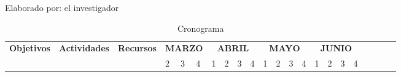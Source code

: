
\begin{landscape}
  \begin{ThreePartTable}
    \begin{TableNotes}[flushleft]
      \centering
      \item Elaborado por: el investigador
    \end{TableNotes}
    \begin{longtable}{|p{}|p{5.5cm}|p{5.5cm}|l|l|l|l|l|l|l|l|l|l|l|l|l|l|l|l|l|l|l|}
      \caption{Cronograma}
      \label{table:cronograma}                                                                                                                                                                                                                                                                                                                                                                                                                                                                                                                                                                                                                                                                                                                                                                                                                                   \\
      \hline
      \multirow{2}{*}{\bfseries Objetivos}                                                                                                                                                     & \multirow{2}{*}{\bfseries Actividades}                                                     & \multirow{2}{*}{\bfseries Recursos}                                                                              & \multicolumn{3}{|c|}{\bfseries MARZO} & \multicolumn{4}{|c|}{\bfseries ABRIL} & \multicolumn{4}{|c|}{\bfseries MAYO} & \multicolumn{4}{|c|}{\bfseries JUNIO}                                                                                                                                                                                                                                                                                    \\
      \cline{4-21}
                                                                                                                                                                                               &                                                                                            &                                                                                                                  & 2                                     & 3                                     & 4                                    & 1                                     & 2                      & 3                      & 4                      & 1                      & 2                      & 3                      & 4                      & 1                      & 2                      & 3                      & 4                      \\

\end{longtable}
\end{ThreePartTable}
\end{landscape}
